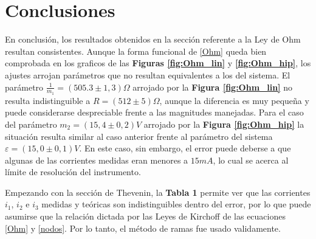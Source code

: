 \documentclass[11pt,a4paper]{article}
\begin{document}

\section{Conclusiones}
\label{sec:conclusiones}

En conclusión, los resultados obtenidos en la sección referente a la Ley de Ohm resultan consistentes. Aunque la forma funcional de \eqref{Ohm} queda bien comprobada en los graficos de las \textbf{Figuras \ref{fig:Ohm_lin}} y \textbf{\ref{fig:Ohm_hip}}, los ajustes arrojan parámetros que no resultan equivalentes a los del sistema. El parámetro $\frac{1}{m_1} = (505.3 \pm 1,3)\Omega$ arrojado por la \textbf{Figura \ref{fig:Ohm_lin}} no resulta indistinguible a $R = (512 \pm 5)\Omega$, aunque la diferencia es muy pequeña y puede considerarse despreciable frente a las magnitudes manejadas. Para el caso del parámetro $m_2 = (15,4 \pm 0,2)V$ arrojado por la \textbf{Figura \ref{fig:Ohm_hip}} la situación resulta similar al caso anterior frente al parámetro del sistema $\varepsilon = (15,0 \pm 0,1)V$. En este caso, sin embargo, el error puede deberse a que algunas de las corrientes medidas eran menores a $15mA$, lo cual se acerca al límite de resolución del instrumento.

Empezando con la sección de Thevenin, la \textbf{Tabla 1} permite ver que las corrientes $i_1$, $i_2$ e $i_3$ medidas y teóricas son indistinguibles dentro del error, por lo que puede asumirse que la relación dictada por las Leyes de Kirchoff de las ecuaciones \eqref{Ohm} y \eqref{nodos}. Por lo tanto, el método de ramas fue usado validamente. 
\end{document}
